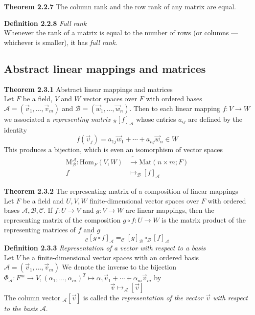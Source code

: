\documentclass[8pt,landscape]{article}
\begin{document}
\begin{multicols}{3}
    \textbf{Theorem 2.2.7}
    The column rank and the row rank of any matrix are equal.

    \textbf{Definition 2.2.8} \emph{Full rank} \\
    Whenever the rank of a matrix is equal to the number of rows
    (or columns --- whichever is smaller), it has \emph{full rank}.

    \subsection{Abstract linear mappings and matrices}

    \textbf{Theorem 2.3.1} Abstract linear mappings and matrices \\
    Let $F$ be a field, $V$ and $W$ vector spaces over $F$ with ordered bases
    $\mathcal{A} = (\vec{v}_1, \ldots, \vec{v}_m)$ and
    $\mathcal{B} = (\vec{w}_1, \ldots, \vec{w}_n)$.
    Then to each linear mapping $f : V \to W$ we associated a \emph{representing matrix}
    $_\mathcal{B}{[f]}_\mathcal{A}$ whose entries $a_{ij}$ are defined by the identity
    \[
        f(\vec{v}_j) = a_{1j}\vec{w}_1 + \cdots + a_{nj}\vec{w}_n \in W
    \]
    This produces a bijection, which is even an isomorphism of vector spaces
    \begin{align*}{}
        \mathrm{M}_\mathcal{B}^\mathcal{A} : \mathrm{Hom}_F(V,W) & \tilde{\to}
        \mathrm{Mat}(n \times m; F) \\
        f &\mapsto _\mathcal{B}{[f]}_\mathcal{A}
    \end{align*}

    \textbf{Theorem 2.3.2} The representing matrix of a composition of linear
    mappings \\
    Let $F$ be a field and $U, V, W$ finite-dimensional vector spaces over $F$ with
    ordered bases $\mathcal{A, B, C}$.
    If $f : U \to V$ and $g : V \to W$ are linear mappings,
    then the representing  matrix of the composition
    $g \circ f : U \to W$
    is the matrix product of the representing matrices of $f$ and $g$
    \[
        _\mathcal{C}{[g \circ f]}_\mathcal{A} = _\mathcal{C}{[g]}_\mathcal{B} \circ
        _\mathcal{B}{[f]}_\mathcal{A}
    \]
    \textbf{Definition 2.3.3} \emph{Representation of a vector with respect to a
    basis} \\
    Let $V$ be a finite-dimensional vector spaces with an ordered basis
    $\mathcal{A} = (\vec{v}_1, \ldots, \vec{v}_m)$
    We denote the inverse to the bijection
    $\Phi_\mathcal{A} : F^m \to V, {(\alpha_1, \ldots, \alpha_m)}^T \mapsto
    \alpha_1\vec{v}_1 + \cdots + \alpha_m\vec{v}_m$ by
    \[
        \vec{v} \mapsto _\mathcal{A}[\vec{v}]
    \]
    The column vector $_\mathcal{A}[\vec{v}]$ is called the \emph{representation of the
    vector $\vec{v}$ with respect to the basis $\mathcal{A}$}.


\end{multicols}
\end{document}
